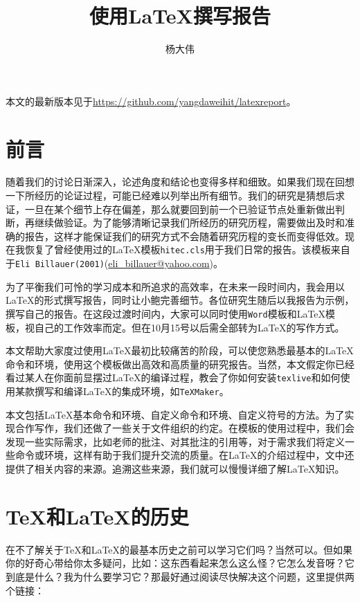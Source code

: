 \documentclass{hitec}
\title{使用\LaTeX{}撰写报告}
\author{杨大伟}
\begin{document}
\maketitle
%
本文的最新版本见于\url{https://github.com/yangdaweihit/latexreport}。

\tableofcontents
\section{前言}
随着我们的讨论日渐深入，论述角度和结论也变得多样和细致。如果我们现在回想一下所经历的论证过程，可能已经难以列举出所有细节。我们的研究是猜想后求证，一旦在某个细节上存在偏差，那么就要回到前一个已验证节点处重新做出判断，再继续做验证。为了能够清晰记录我们所经历的研究历程，需要做出及时和准确的报告，这样才能保证我们的研究方式不会随着研究历程的变长而变得低效。现在我恢复了曾经使用过的\LaTeX{}模板\texttt{hitec.cls}用于我们日常的报告。该模板来自于\texttt{Eli Billauer(2001)}(\url{eli_billauer@yahoo.com})。

为了平衡我们可怜的学习成本和所追求的高效率，在未来一段时间内，我会用以\LaTeX{}的形式撰写报告，同时让小鲍完善细节。各位研究生随后以我报告为示例，撰写自己的报告。在这段过渡时间内，大家可以同时使用\texttt{Word}模板和\LaTeX{}模板，视自己的工作效率而定。但在10月15号以后需全部转为\LaTeX{}的写作方式。

本文帮助大家度过使用\LaTeX{}最初比较痛苦的阶段，可以使您熟悉最基本的\LaTeX{}命令和环境，使用这个模板做出高效和高质量的研究报告。当然，本文假定你已经看过某人在你面前显摆过\LaTeX{}的编译过程，教会了你如何安装\texttt{texlive}和如何使用某款撰写和编译\LaTeX{}的集成环境，如\texttt{TeXMaker}。

本文包括\LaTeX{}基本命令和环境、自定义命令和环境、自定义符号的方法。为了实现合作写作，我们还做了一些关于文件组织的约定。在模板的使用过程中，我们会发现一些实际需求，比如老师的批注、对其批注的引用等，对于需求我们将定义一些命令或环境，这样有助于我们提升交流的质量。在\LaTeX{}的介绍过程中，文中还提供了相关内容的来源。追溯这些来源，我们就可以慢慢详细了解\LaTeX{}知识。

\section{\TeX{}和\LaTeX{}的历史}
在不了解关于\TeX{}和\LaTeX{}的最基本历史之前可以学习它们吗？当然可以。但如果你的好奇心带给你太多疑问，比如：这东西看起来怎么这么怪？它怎么发音呀？它到底是什么？我为什么要学习它？那最好通过阅读尽快解决这个问题，这里提供两个链接：
\end{document}
